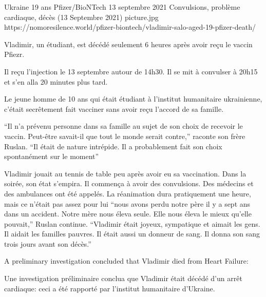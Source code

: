 {Ukraine}
{19 ans}
{Pfizer/BioNTech}
{13 septembre 2021}
{Convulsions, problème cardiaque, décès (13 Septembre 2021)}
{picture.jpg}
{https://nomoresilence.world/pfizer-biontech/vladimir-salo-aged-19-pfizer-death/}
{

Vladimir, un étudiant, est décédé seulement 6 heures après avoir reçu le vaccin
Pfiezr.

Il reçu l'injection le 13 septembre autour de 14h30. Il se mit à convulser à
20h15 et s'en alla 20 minutes plus tard.

Le jeune homme de 10 ans qui était étudiant à l'institut humanitaire
ukrainienne, c'était secrêtement fait vacciner sans avoir reçu l'accord de sa
famille.

“Il n'a prévenu personne dans sa famille au sujet de son choix de recevoir le
vaccin. Peut-être savait-il que tout le monde serait contre,” raconte son frère
Ruslan. “Il était de nature intrépide. Il a probablement fait son choix
spontanément sur le moment”

Vladimir jouait au tennis de table peu après avoir eu sa vaccination. Dans la
soirée, son état s'empira. Il commença à avoir des convulsions. Des médecins et
des ambulances ont été appelés. La réanimation dura pratiquement une heure, mais
ce n'était pas assez pour lui “nous avons perdu notre père il y a sept ans dans
un accident. Notre mère nous éleva seule. Elle nous éleva le mieux qu'elle
pouvait,” Ruslan continue. “Vladimir était joyeux, sympatique et aimait les
gens. Il aidait les familles pauvres. Il était aussi un donneur de sang. Il
donna son sang trois jours avant son décès.”

A preliminary investigation concluded that Vladimir died from Heart Failure:

Une investigation préliminaire conclua que Vladimir était décédé d'un arrêt
cardiaque: ceci a été rapporté par l'institut humanitaire d'Ukraine.

}
